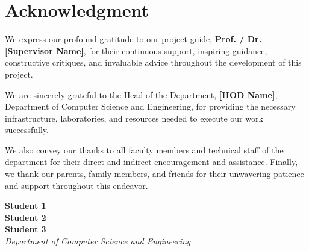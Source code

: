 \chapter*{Acknowledgment}

We express our profound gratitude to our project guide, \textbf{Prof. / Dr. [Supervisor Name]}, for their continuous support, inspiring guidance, constructive critiques, and invaluable advice throughout the development of this project.

We are sincerely grateful to the Head of the Department, \textbf{[HOD Name]}, Department of Computer Science and Engineering, for providing the necessary infrastructure, laboratories, and resources needed to execute our work successfully.

We also convey our thanks to all faculty members and technical staff of the department for their direct and indirect encouragement and assistance. Finally, we thank our parents, family members, and friends for their unwavering patience and support throughout this endeavor.

\vspace{2cm}

\noindent
\begin{flushright}
    \textbf{Student 1}\\
    \textbf{Student 2}\\
    \textbf{Student 3}\\
    \textit{Department of Computer Science and Engineering}
\end{flushright}

\clearpage
